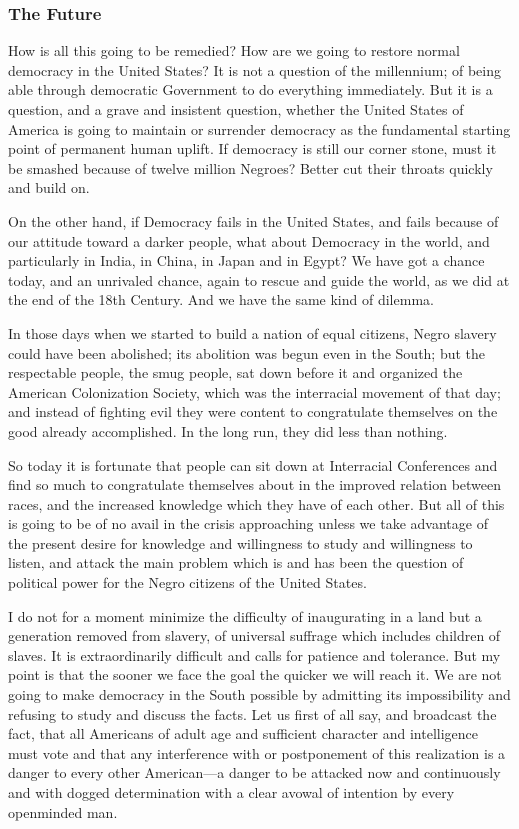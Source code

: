 \documentclass[letterpaper,10pt,english]{jupyterBook}
\begin{document}
\subsubsection{The Future}
\label{\detokenize{Volumes/36/05/negro_citizen:the-future}}
\sphinxAtStartPar
How is all this going to be remedied? How are we going to restore normal democracy in the United States? It is not a question of the millennium; of being able through democratic Government to do everything immediately. But it is a question, and a grave and insistent question, whether the United States of America is going to maintain or surrender democracy as the fundamental starting point of permanent human uplift. If democracy is still our corner stone, must it be smashed because of twelve million Negroes? Better cut their throats quickly and build on.

\sphinxAtStartPar
On the other hand, if Democracy fails in the United States, and fails because of our attitude toward a darker people, what about Democracy in the world, and particularly in India, in China, in Japan and in Egypt? We have got a chance today, and an unrivaled chance, again to rescue and guide the world, as we did at the end of the 18th Century. And we have the same kind of dilemma.

\sphinxAtStartPar
In those days when we started to build a nation of equal citizens, Negro slavery could have been abolished; its abolition was begun even in the South; but the respectable people, the smug people, sat down before it and organized the American Colonization Society, which was the interracial movement of that day; and instead of fighting evil they were content to congratulate themselves on the good already accomplished. In the long run, they did less than nothing.

\sphinxAtStartPar
So today it is fortunate that people can sit down at Interracial Conferences and find so much to congratulate themselves about in the improved relation between races, and the increased knowledge which they have of each other. But all of this is going to be of no avail in the crisis approaching unless we take advantage of the present desire for knowledge and willingness to study and willingness to listen, and attack the main problem which is and has been the question of political power for the Negro citizens of the United States.

\sphinxAtStartPar
I do not for a moment minimize the difficulty of inaugurating in a land but a generation removed from slavery, of universal suffrage which includes children of slaves. It is extraordinarily difficult and calls for patience and tolerance. But my point is that the sooner we face the goal the quicker we will reach it. We are not going to make democracy in the South possible by admitting its impossibility and refusing to study and discuss the facts. Let us first of all say, and broadcast the fact, that all Americans of adult age and sufficient character and intelligence must vote and that any interference with or postponement of this realization is a danger to every other American—a danger to be attacked now and continuously and with dogged determination with a clear avowal of intention by every open\sphinxhyphen{}minded man.
\end{document}
